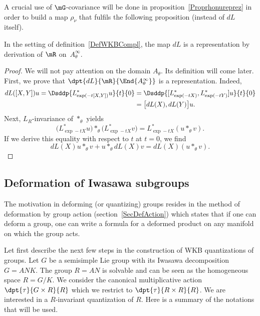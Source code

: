 A crucial use of $\mG$-covariance will be done in proposition~\ref{Proprhonureprez} in order to build a map $\rho_{\nu}$ that fulfils the following proposition (instead of $dL$ itself).
\begin{proposition}
In the setting of definition~\ref{DefWKBCompl}, the map $dL$ is a representation  by derivation of $\mR$  on~$ A_{\theta}^{\infty}$.
\label{prop:dL_reprez}
\end{proposition}

\begin{proof}
We will not pay attention on the domain $A_{\theta}$. Its definition will come later.  First, we prove that $\dpt{dL}{\mR}{\End{ A_{\theta}^{\infty}}}$ is a representation. Indeed,
\begin{equation}
\begin{split}
  dL([X,Y])u=\Dsddp{L^*_{\exp(-t[X,Y])}u}{t}{0}
            &=\Dsddp{ [ L^*_{\exp(-tX)},L^*_{\exp(-tY)}  ] u}{t}{0}\\
        &=\big[dL(X),dL(Y)\big]u.
\end{split}
\end{equation}
Next, $L_R$-invariance of $\ast_{\theta}$ yields
\[
  \big( L^*_{\exp -tX}u \big)\ast_{\theta}\big( L^*_{\exp -tX}v \big)=L^*_{\exp -tX}(u\ast_{\theta} v).
\]
If we derive this equality with respect to $t$ at $t=0$, we find
\[
   dL(X)u\ast_{\theta} v+u\ast_{\theta} dL(X)v=dL(X)(u\ast_{\theta} v).
\]
\end{proof}

\subsection{Deformation of Iwasawa subgroups}   %

The motivation in deforming (or quantizing) groups resides in the method of deformation by group action (section~\ref{SecDefAction}) which states that if one can deform a group, one can write a formula for a deformed product on any manifold on which the group acts.

Let first describe the next few steps in the construction of WKB quantizations of groups. Let $G$ be a semisimple Lie group with its Iwasawa decomposition $G=ANK$. The group $R=AN$ is solvable and can be seen as the homogeneous space $R=G/K$. We consider the canonical multiplicative action $\dpt{\tau}{G\times R}{R}$ which we restrict to $\dpt{\tau}{R\times R}{R}$. We are interested in a $R$-invariant quantization of $R$. Here is a summary of the notations that will be used.


